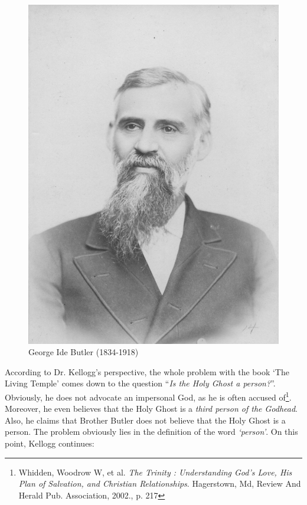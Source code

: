 \begin{figure}[hp]
    \centering
    \includegraphics[width=1\linewidth]{images/george-ide-butler.jpg}
    \caption*{George Ide Butler (1834-1918)}
    \label{fig:g-i-butler}
\end{figure}


According to Dr. Kellogg’s perspective, the whole problem with the book ‘The Living Temple’ comes down to the question “\textit{Is the Holy Ghost a person?}”. Obviously, he does not advocate an impersonal God, as he is often accused of\footnote{Whidden, Woodrow W, et al. \textit{The Trinity : Understanding God's Love, His Plan of Salvation, and Christian Relationships}. Hagerstown, Md, Review And Herald Pub. Association, 2002., p. 217}. Moreover, he even believes that the Holy Ghost is a \textit{third person of the Godhead}. Also, he claims that Brother Butler does not believe that the Holy Ghost is a person. The problem obviously lies in the definition of the word \textit{‘person’}. On this point, Kellogg continues:


